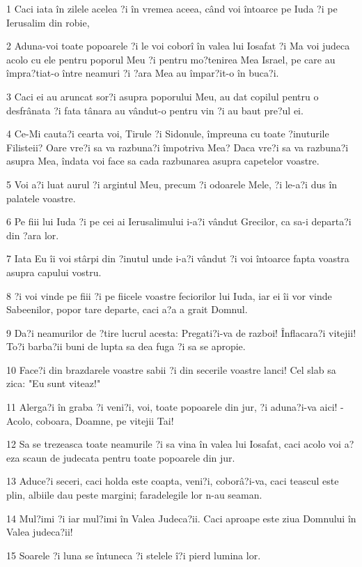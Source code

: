 \par 1 Caci iata în zilele acelea ?i în vremea aceea, când voi întoarce pe Iuda ?i pe Ierusalim din robie,
\par 2 Aduna-voi toate popoarele ?i le voi coborî în valea lui Iosafat ?i Ma voi judeca acolo cu ele pentru poporul Meu ?i pentru mo?tenirea Mea Israel, pe care au împra?tiat-o între neamuri ?i ?ara Mea au împar?it-o în buca?i.
\par 3 Caci ei au aruncat sor?i asupra poporului Meu, au dat copilul pentru o desfrânata ?i fata tânara au vândut-o pentru vin ?i au baut pre?ul ei.
\par 4 Ce-Mi cauta?i cearta voi, Tirule ?i Sidonule, împreuna cu toate ?inuturile Filisteii? Oare vre?i sa va razbuna?i împotriva Mea? Daca vre?i sa va razbuna?i asupra Mea, îndata voi face sa cada razbunarea asupra capetelor voastre.
\par 5 Voi a?i luat aurul ?i argintul Meu, precum ?i odoarele Mele, ?i le-a?i dus în palatele voastre.
\par 6 Pe fiii lui Iuda ?i pe cei ai Ierusalimului i-a?i vândut Grecilor, ca sa-i departa?i din ?ara lor.
\par 7 Iata Eu îi voi stârpi din ?inutul unde i-a?i vândut ?i voi întoarce fapta voastra asupra capului vostru.
\par 8 ?i voi vinde pe fiii ?i pe fiicele voastre feciorilor lui Iuda, iar ei îi vor vinde Sabeenilor, popor tare departe, caci a?a a grait Domnul.
\par 9 Da?i neamurilor de ?tire lucrul acesta: Pregati?i-va de razboi! Înflacara?i vitejii! To?i barba?ii buni de lupta sa dea fuga ?i sa se apropie.
\par 10 Face?i din brazdarele voastre sabii ?i din secerile voastre lanci! Cel slab sa zica: "Eu sunt viteaz!"
\par 11 Alerga?i în graba ?i veni?i, voi, toate popoarele din jur, ?i aduna?i-va aici! - Acolo, coboara, Doamne, pe vitejii Tai!
\par 12 Sa se trezeasca toate neamurile ?i sa vina în valea lui Iosafat, caci acolo voi a?eza scaun de judecata pentru toate popoarele din jur.
\par 13 Aduce?i seceri, caci holda este coapta, veni?i, coborâ?i-va, caci teascul este plin, albiile dau peste margini; faradelegile lor n-au seaman.
\par 14 Mul?imi ?i iar mul?imi în Valea Judeca?ii. Caci aproape este ziua Domnului în Valea judeca?ii!
\par 15 Soarele ?i luna se întuneca ?i stelele î?i pierd lumina lor.
